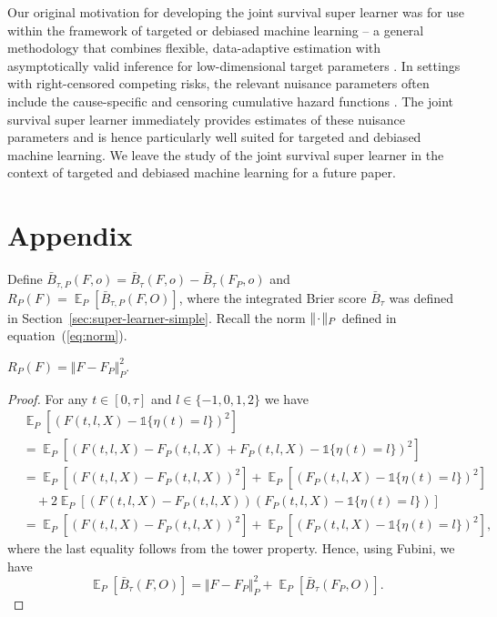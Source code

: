 \documentclass[lineno]{biometrika}
\DeclareMathOperator{\E}{\mathbb{E}} %
\newcommand{\blank}{\makebox[1ex]{\textbf{$\cdot$}}}
\newcommand{\1}{\mathds{1}}
\begin{document}
Our original motivation for developing the joint survival super
learner was for use within the framework of targeted or debiased
machine learning -- a general methodology that combines flexible,
data-adaptive estimation with asymptotically valid inference for
low-dimensional target parameters
\citep{van2011targeted,chernozhukov2018double}. In settings with
right-censored competing risks, the relevant nuisance parameters often
include the cause-specific and censoring cumulative hazard functions
\citep[e.g.,][]{van2003unified,rytgaard2022targeted}. The joint
survival super learner immediately provides estimates of these
nuisance parameters and is hence particularly well suited for targeted
and debiased machine learning. We leave the study of the joint
survival super learner in the context of targeted and debiased machine
learning for a future paper.

\appendix

\section*{Appendix}


Define
\( \bar{B}_{\tau,P}(F, o) = \bar{B}_{\tau}(F, o) -
\bar{B}_{\tau}(F_P, o) \) and
\( R_{P}(F) = \E_P{[\bar{B}_{\tau,P}(F, O)]} \), where the
integrated Brier score \( \bar{B}_{\tau} \) was defined in
Section~\ref{sec:super-learner-simple}. Recall the norm
\( \Vert \blank \Vert_{P}\) defined in
equation~(\ref{eq:norm}).

\begin{lemma}
  \label{lemma:norm}
  \( R_{P}(F) = \Vert F - F_P \Vert_{P}^2 \).
\end{lemma}
\begin{proof}
  For any \( t \in [0, \tau] \) and \( l\in \{-1,0,1,2\} \) we have
  \begin{align*}
    & \E_{P}{\left[ (F(t, l, X) - \1{\{\eta(t) = l \}})^2 \right]}
    \\
    & =    \E_{P}{\left[ (F(t, l, X) - F_P(t, l, X) + F_P(t, l, X) - \1{\{\eta(t) = l
      \}})^2 \right]}
    \\
    & =    \E_{P}{\left[ (F(t, l, X) - F_P(t, l, X))^2\right]}
      + \E_{P}{\left[ (F_P(t, l, X) - \1{\{\eta(t) = l \}})^2\right]}
    \\
    & \quad
      + 2\E_{P}{\left[ (F(t, l, X) - F_P(t, l, X))(F_P(t, l, X) - \1{\{\eta(t) = l
      \}})\right]}
    \\
    & =    \E_{P}{\left[ (F(t, l, X) - F_P(t, l, X))^2\right]}
      + \E_{P}{\left[ (F_P(t, l, X) - \1{\{\eta(t) = l \}})^2\right]},
  \end{align*}
  where the last equality follows from the tower property. Hence, using Fubini,
  we have
  \begin{equation*}
    \E_P{[\bar{B}_{\tau}(F, O)]}
    = \Vert F - F_P \Vert_{P}^2 + \E_P{[\bar{B}_{\tau}(F_P, O)]}.
  \end{equation*}
\end{proof}
\end{document}
